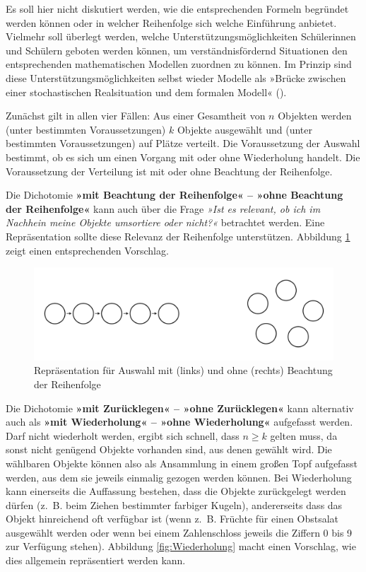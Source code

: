 \documentclass[
]{scrbook}
\theoremstyle{definition}
\theoremstyle{definition}
\theoremstyle{definition}
\theoremstyle{definition}
\theoremstyle{remark}
\begin{document}
Es soll hier nicht diskutiert werden, wie die entsprechenden Formeln begründet werden können oder in welcher Reihenfolge sich welche Einführung anbietet. Vielmehr soll überlegt werden, welche Unterstützungsmöglichkeiten Schülerinnen und Schülern geboten werden können, um verständnisfördernd Situationen den entsprechenden mathematischen Modellen zuordnen zu können. Im Prinzip sind diese Unterstützungsmöglichkeiten selbst wieder Modelle als »Brücke zwischen einer stochastischen Realsituation und dem formalen Modell« ().

Zunächst gilt in allen vier Fällen: Aus einer Gesamtheit von \(n\) Objekten werden (unter bestimmten Voraussetzungen) \(k\) Objekte ausgewählt und (unter bestimmten Voraussetzungen) auf Plätze verteilt. Die Voraussetzung der Auswahl bestimmt, ob es sich um einen Vorgang mit oder ohne Wiederholung handelt. Die Voraussetzung der Verteilung ist mit oder ohne Beachtung der Reihenfolge.

Die Dichotomie \textbf{»mit Beachtung der Reihenfolge« -- »ohne Beachtung der Reihenfolge«} kann auch über die Frage \emph{»Ist es relevant, ob ich im Nachhein meine Objekte umsortiere oder nicht?«} betrachtet werden. Eine Repräsentation sollte diese Relevanz der Reihenfolge unterstützen. Abbildung \ref{fig:Reihenfolge} zeigt einen entsprechenden Vorschlag.

\begin{figure}

{\centering \includegraphics[width=0.75\linewidth]{pictures/12-Reihenfolge} 

}

\caption{Repräsentation für Auswahl mit (links) und ohne (rechts) Beachtung der Reihenfolge}\label{fig:Reihenfolge}
\end{figure}

Die Dichotomie \textbf{»mit Zurücklegen« -- »ohne Zurücklegen«} kann alternativ auch als \textbf{»mit Wiederholung« -- »ohne Wiederholung«} aufgefasst werden. Darf nicht wiederholt werden, ergibt sich schnell, dass \(n\geq k\) gelten muss, da sonst nicht genügend Objekte vorhanden sind, aus denen gewählt wird. Die wählbaren Objekte können also als Ansammlung in einem großen Topf aufgefasst werden, aus dem sie jeweils einmalig gezogen werden können. Bei Wiederholung kann einerseits die Auffassung bestehen, dass die Objekte zurückgelegt werden dürfen (z.~B. beim Ziehen bestimmter farbiger Kugeln), andererseits dass das Objekt hinreichend oft verfügbar ist (wenn z.~B. Früchte für einen Obstsalat ausgewählt werden oder wenn bei einem Zahlenschloss jeweils die Ziffern 0 bis 9 zur Verfügung stehen). Abbildung \ref{fig:Wiederholung} macht einen Vorschlag, wie dies allgemein repräsentiert werden kann.
\end{document}
